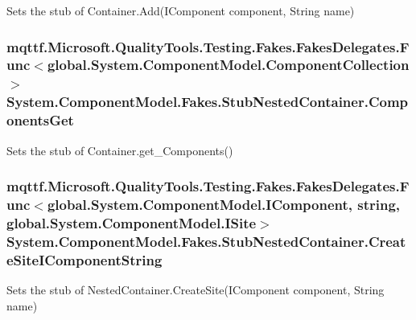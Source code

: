 Sets the stub of Container.\-Add(\-I\-Component component, String name)

\hypertarget{class_system_1_1_component_model_1_1_fakes_1_1_stub_nested_container_a6a77f4478de245c0b169f444a92d6e7d}{
\subsubsection[{Components\-Get}]{\setlength{\rightskip}{0pt plus 5cm}mqttf.\-Microsoft.\-Quality\-Tools.\-Testing.\-Fakes.\-Fakes\-Delegates.\-Func$<$global.\-System.\-Component\-Model.\-Component\-Collection$>$ System.\-Component\-Model.\-Fakes.\-Stub\-Nested\-Container.\-Components\-Get}}\label{class_system_1_1_component_model_1_1_fakes_1_1_stub_nested_container_a6a77f4478de245c0b169f444a92d6e7d}


Sets the stub of Container.\-get\-\_\-\-Components()

\hypertarget{class_system_1_1_component_model_1_1_fakes_1_1_stub_nested_container_a9295b22ff0765d38e7d59762196dad85}{
\subsubsection[{Create\-Site\-I\-Component\-String}]{\setlength{\rightskip}{0pt plus 5cm}mqttf.\-Microsoft.\-Quality\-Tools.\-Testing.\-Fakes.\-Fakes\-Delegates.\-Func$<$global.\-System.\-Component\-Model.\-I\-Component, string, global.\-System.\-Component\-Model.\-I\-Site$>$ System.\-Component\-Model.\-Fakes.\-Stub\-Nested\-Container.\-Create\-Site\-I\-Component\-String}}\label{class_system_1_1_component_model_1_1_fakes_1_1_stub_nested_container_a9295b22ff0765d38e7d59762196dad85}


Sets the stub of Nested\-Container.\-Create\-Site(\-I\-Component component, String name)

